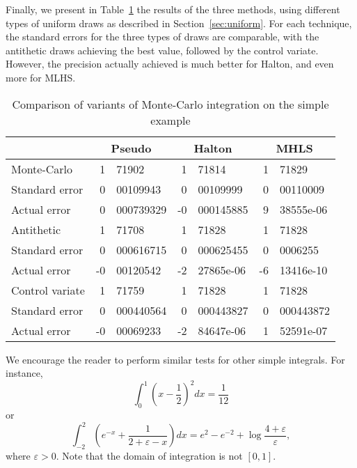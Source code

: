 \documentclass[12pt,a4paper]{article}
\begin{document}
Finally, we present in Table~\ref{tab:resultsSimple} the results of
the three methods, using different types of uniform draws as
described in Section~\ref{sec:uniform}. For each technique, the
standard errors for the three types of draws are comparable, with the
antithetic draws achieving the best value, followed by the control
variate. However, the precision actually achieved is much better for
Halton, and even more for MLHS.

\begin{table}[htb]
\begin{center}
\begin{tabular}{l|r@{.}lr@{.}lr@{.}l}
       & \multicolumn{2}{c}{Pseudo} &  \multicolumn{2}{c}{Halton} &
  \multicolumn{2}{c}{MHLS} \\
\hline 
Monte-Carlo    &  1&71902 &  1&71814 & 1&71829 \\
Standard error & 0&00109943 & 0&00109999 & 0&00110009 \\
Actual error   & 0&000739329 & -0&000145885 & 9&38555e-06 \\
\hline
Antithetic  & 1&71708 & 1&71828 & 1&71828 \\
Standard error & 0&000616715 & 0&000625455 & 0&0006255 \\
Actual error & -0&00120542 & -2&27865e-06 & -6&13416e-10 \\
\hline
Control variate & 1&71759 & 1&71828 & 1&71828 \\
Standard error & 0&000440564 & 0&000443827 & 0&000443872 \\
Actual error & -0&00069233 & -2&84647e-06 & 1&52591e-07 \\
\hline
\end{tabular}
\caption{\label{tab:resultsSimple}Comparison of variants of
  Monte-Carlo integration on the simple example}
\end{center}
\end{table}

We encourage the reader to perform similar  tests for other simple
integrals. For instance,
\begin{equation}
\int_0^1 \left(x-\frac{1}{2} \right)^2 dx = \frac{1}{12}
\end{equation}
or
\begin{equation}
\int_{-2}^2 \left( e^{-x} + \frac{1}{2+\varepsilon-x}\right)dx= e^2 -
e^{-2} + \log \frac{4+\varepsilon}{\varepsilon},
\end{equation}
where $\varepsilon > 0$. Note that the domain of integration is not $[0,1]$.
\end{document}
